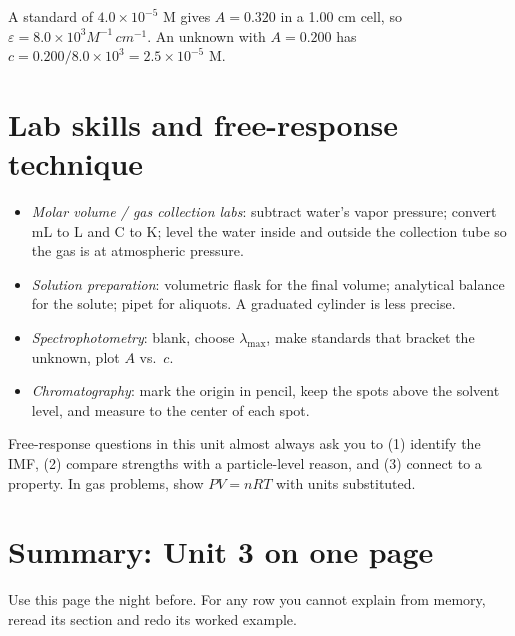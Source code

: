 \documentclass[11pt]{article}
\begin{document}
 A standard of $4.0\times10^{-5}$ M gives $A = 0.320$ in a 1.00 cm cell, so $\varepsilon = 8.0\times10^3\unit{M^{-1}\,cm^{-1}}$. An unknown with $A = 0.200$ has $c = 0.200/8.0\times10^3 = 2.5\times10^{-5}$ M.

\section{Lab skills and free-response technique}\label{t:lab}
\begin{itemize}
\item \emph{Molar volume / gas collection labs}: subtract water's vapor pressure; convert mL to L and \textdegree C to K; level the water inside and outside the collection tube so the gas is at atmospheric pressure.
\item \emph{Solution preparation}: volumetric flask for the final volume; analytical balance for the solute; pipet for aliquots. A graduated cylinder is less precise.
\item \emph{Spectrophotometry}: blank, choose $\lambda_{\max}$, make standards that bracket the unknown, plot $A$ vs.\ $c$.
\item \emph{Chromatography}: mark the origin in pencil, keep the spots above the solvent level, and measure to the center of each spot.
\end{itemize}
Free-response questions in this unit almost always ask you to (1) identify the IMF, (2) compare strengths with a particle-level reason, and (3) connect to a property. In gas problems, show $PV = nRT$ with units substituted.

\clearpage
\section*{Summary: Unit 3 on one page}
Use this page the night before. For any row you cannot explain from memory, reread its section and redo its worked example.
\end{document}
